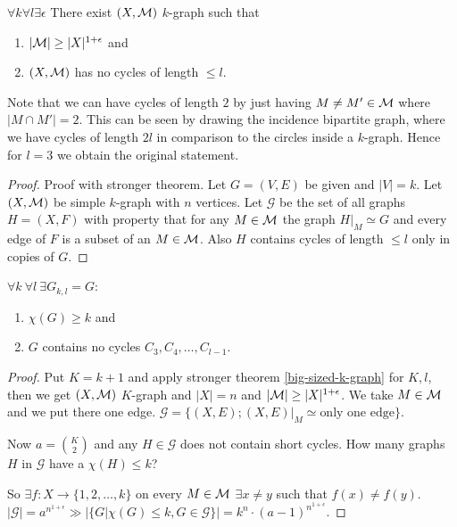 \begin{thm}
	$\forall k \forall l \exists \epsilon$ There exist $(X, \mathcal{M})$ $k$-graph such that
	
	\begin{enumerate}
		\item $|\mathcal{M}| \geq |X|^{1 + \epsilon}$ and
		\item $(X, \mathcal{M})$ has no cycles of length $\leq l$.
	\end{enumerate}
	\label{big-sized-k-graph}
\end{thm}

Note that we can have cycles of length $2$ by just having $M \neq M' \in \mathcal{M}$ where $|M \cap M'| = 2$. This can be seen by drawing the incidence bipartite graph, where we have cycles of length $2l$ in comparison to the circles inside a $k$-graph. Hence for $l = 3$ we obtain the original statement.

\begin{proof}{Proof with stronger theorem.}
	Let $G = (V,E)$ be given and $|V| = k$. Let $(X, \mathcal{M})$ be simple $k$-graph with $n$ vertices. Let $\mathcal{G}$ be the set of all graphs $H = (X,F)$ with property that for any $M \in \mathcal{M}$ the graph $H|_M \simeq G$ and every edge of $F$ is a subset of an $M \in \mathcal{M}$. Also $H$ contains cycles of length $\leq l$ only in copies of $G$.
\end{proof}

\begin{thm}
	$\forall k \ \forall l \ \exists G_{k,l} = G$:
	
	\begin{enumerate}
		\item $\chi(G) \geq k$ and
		\item $G$ contains no cycles $C_3, C_4, \dots, C_{l-1}$.
	\end{enumerate}
\end{thm}

\begin{proof}
	Put $K = k+1$ and apply stronger theorem \ref{big-sized-k-graph} for $K,l$, then we get $(X, \mathcal{M})$ $K$-graph and $|X| = n$ and $|\mathcal{M}| \geq |X|^{1 + \epsilon}$. We take $M \in \mathcal{M}$ and we put there one edge. $\mathcal{G} = \{(X,E); (X,E)|_M \simeq \text{only one edge}\}$.
	
	Now $a = \binom{K}{2}$ and any $H \in \mathcal{G}$ does not contain short cycles. How many graphs $H$ in $\mathcal{G}$ have a $\chi(H) \leq k$?
	
	So $\exists f: X \to \{1, 2, \dots, k\}$ on every $M \in \mathcal{M}$ $\exists x \neq y$ such that $f(x) \neq f(y)$. $|\mathcal{G}| = a^{n^{1+\epsilon}} \gg |\{G | \chi(G) \leq k, G \in \mathcal{G}\}| = k^n \cdot (a-1)^{n^{1 + \epsilon}}$.
\end{proof}

